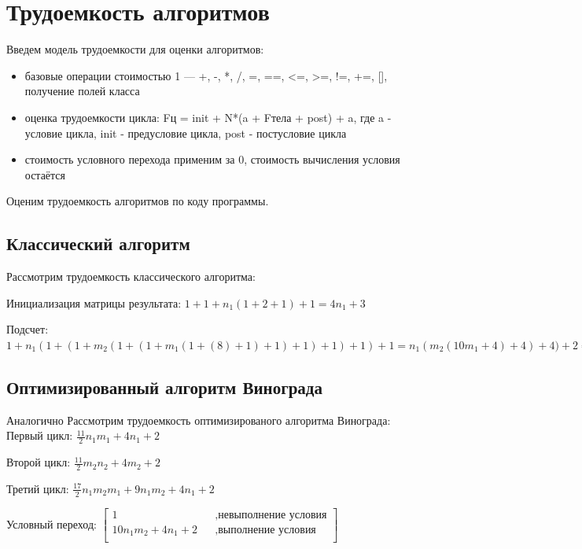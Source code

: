 \documentclass[12pt]{report}
\begin{document}
\newpage
\section{Трудоемкость алгоритмов}
Введем модель трудоемкости для оценки алгоритмов: 
\begin{itemize}
	\item базовые операции стоимостью 1 — +, -, *, /, =, ==, <=, >=, !=, +=, [], получение полей класса
	\item оценка трудоемкости цикла: Fц = init +  N*(a + Fтела + post) + a, где a - условие цикла, init - предусловие цикла, post - постусловие цикла
	\item стоимость условного перехода применим за 0, стоимость вычисления условия остаётся
\end{itemize}

Оценим трудоемкость алгоритмов по коду программы.

\subsection{Классический алгоритм}
Рассмотрим трудоемкость классического алгоритма:  

Инициализация матрицы результата: $1 + 1 + n_1(1 + 2 + 1) + 1 = 4n_1 + 3$

Подсчет:\\
$1 + n_1(1 + (1 + m_2(1 + (1 + m_1(1 + (8) + 1) + 1) + 1) + 1) + 1) + 1 = 
n_1(m_2(10m_1 + 4) + 4) + 4) + 2 = 10n_1m_2m_1+ 4n_1m_2 + 4n_1 +2
$

\subsection{Оптимизированный алгоритм Винограда}

Аналогично Рассмотрим трудоемкость оптимизированого алгоритма Винограда:\\

Первый цикл: $\frac{11}{2}n_1m_1 + 4n_1 + 2$ 

Второй цикл: $\frac{11}{2}m_2n_2+ 4m_2 + 2$

Третий цикл: $\frac{17}{2}n_1m_2m_1 + 9n_1m_2 + 4n_1 + 2$

Условный переход: $\begin{bmatrix}
1    &&, \text{невыполнение условия}\\
10n_1m_2 + 4n_1 + 2 &&, \text{выполнение условия}\\
\end{bmatrix} $ \\
\end{document}
